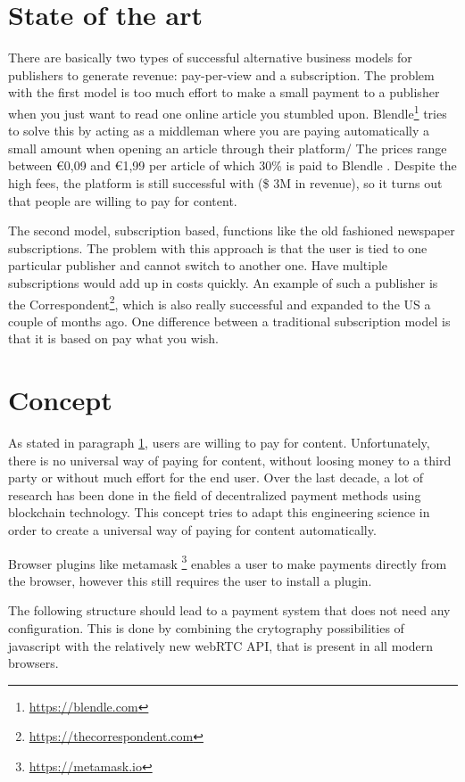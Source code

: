\documentclass[a4paper]{article}
\begin{document}
\section{State of the art}
\label{stateoftheart}
There are basically two types of successful alternative business models for publishers to generate revenue: pay-per-view and a subscription. The problem with the first model is too much effort to make a small payment to a publisher when you just want to read one online article you stumbled upon. Blendle\footnote{\url{https://blendle.com}} tries to solve this by acting as a middleman where you are paying automatically a small amount when opening an article through their platform/ The prices range between €0,09 and €1,99 per article of which 30\% is paid to Blendle . Despite the high fees, the platform is still successful with (\$ 3M in revenue), so it turns out that people are willing to pay for content.

The second model, subscription based, functions like the old fashioned newspaper subscriptions.  The problem with this approach is that the user is tied to one particular publisher and cannot switch to another one. Have multiple subscriptions would add up in costs quickly. An example of such a publisher is the Correspondent\footnote{\url{https://thecorrespondent.com}}, which is also really successful and expanded to the US a couple of months ago. One difference between a traditional subscription model is that it is based on pay what you wish.

\section {Concept}
As stated in paragraph \ref{stateoftheart}, users are willing to pay for content. Unfortunately, there is no universal way of paying for content, without loosing money to a third party or without much effort for the end user. Over the last decade, a lot of research has been done in the field of decentralized payment methods using blockchain technology. This concept tries to adapt this engineering science in order to create a universal way of paying for content automatically.

Browser plugins like metamask \footnote{\url{https://metamask.io}} enables a user to make payments directly from the browser, however this still requires the user to install a plugin.

The following structure should lead to a payment system that does not need any configuration. This is done by combining the crytography possibilities of javascript with the relatively new webRTC API, that is present in all modern browsers.
\end{document}
